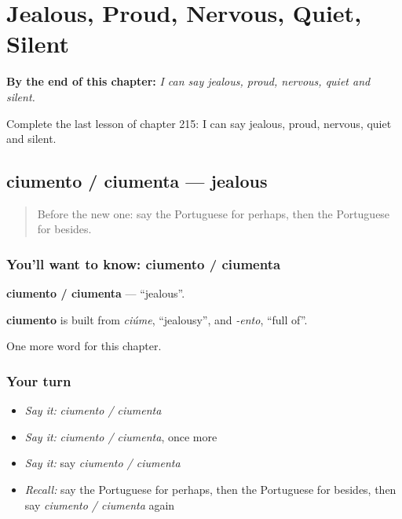 
\chapter{Jealous, Proud, Nervous, Quiet, Silent}
\label{ch:pt-jealous-proud-nervous-quiet-silent}

\begin{chapteropening}
\textbf{By the end of this chapter:} \emph{I can say jealous, proud, nervous, quiet and silent.}

Complete the last lesson of chapter 215: I can say jealous, proud, nervous, quiet and silent.
\end{chapteropening}

\section[ciumento / ciumenta]{ciumento / ciumenta — jealous}

\label{lesson:PT-C215-ciumento-ciumenta}



\begin{quote}
Before the new one: say the Portuguese for perhaps, then the Portuguese for besides.
\end{quote}

\subsection*{You'll want to know: ciumento / ciumenta}
\textbf{ciumento / ciumenta} — \textquotedblleft{}jealous\textquotedblright{}.

\begin{cousinweb}
\textbf{ciumento} is built from \emph{ciúme}, \textquotedblleft{}jealousy\textquotedblright{}, and \emph{-ento}, \textquotedblleft{}full of\textquotedblright{}.
\end{cousinweb}

\begin{grammarlens}[title={What you've built}]
One more word for this chapter.
\end{grammarlens}

\subsection*{Your turn}
\begin{itemize}
\raggedright
  \item \emph{Say it:} \emph{ciumento / ciumenta}
  \item \emph{Say it:} \emph{ciumento / ciumenta}, once more
  \item \emph{Say it:} say \emph{ciumento / ciumenta}
  \item \emph{Recall:} say the Portuguese for perhaps, then the Portuguese for besides, then say \emph{ciumento / ciumenta} again
\end{itemize}

